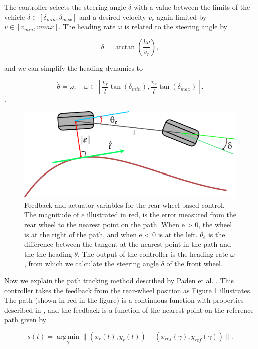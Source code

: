 \documentclass[symmetry,article,submit,moreauthors,pdftex]{Definitions/mdpi}
\begin{document}
The controller selects the steering angle $\delta$ with a value between the
limits of the vehicle $\delta \in [\delta_{min},\delta_{max}]$ and a desired
velocity $v_r$ again limited by $v\in [v_{min},v{max}]$. The heading rate
$\omega$ is related to the steering angle by 

\begin{equation}
       \delta = \arctan \left(\frac{l\omega}{v_r}\right),
\end{equation}

and we can simplify the heading dynamics to 

\begin{equation}
    \dot{\theta} = \omega,\quad \omega \in \left[\frac{v_r}{l} \tan(\delta_{min}),\frac{v_r}{l} \tan(\delta_{max} ) \right].
\end{equation}.

\begin{figure}[H] \includegraphics[width=10.5 cm]{img/path} \caption{ Feedback
        and actuator variables for the rear-wheel-based control. The magnitude
        of $e$ illustrated in red, is the error measured from the rear wheel to
        the nearest point on the path. When e > 0, the wheel is at the right of
        the path, and when e < 0 is at the left. $\theta_e$ is the
        difference between the tangent at the nearest point in the path and the
        the heading $\theta$. The output of the controller is the heading rate
        $\omega$, from which we calculate the steering angle $\delta$ of the front wheel.
}\label{fig:kinematics}    \end{figure} 

Now we explain the path tracking method described by Paden et al.
\cite{paden_survey_2016}.  This controller takes the feedback from the
rear-wheel position as Figure \ref{fig:kinematics} illustrates.  The path
(shown in red in the figure) is a continuous function with properties
described in \cite{samson1992path}, and the feedback is a function of the
nearest point on the reference path given by 

\begin{equation}\label{eq:gamma}
s(t) = \operatorname*{arg\,min}_{\gamma} \|(x_r(t),y_r(t)) - (x_{ref}(\gamma),y_{ref}(\gamma)) \|.
\end{equation}
\end{document}

